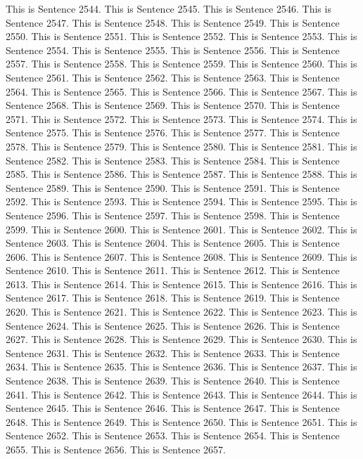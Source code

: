 \documentclass{article}
\begin{document}
This is Sentence 2544.
This is Sentence 2545.
This is Sentence 2546.
This is Sentence 2547.
This is Sentence 2548.
This is Sentence 2549.
This is Sentence 2550.
This is Sentence 2551.
This is Sentence 2552.
This is Sentence 2553.
This is Sentence 2554.
This is Sentence 2555.
This is Sentence 2556.
This is Sentence 2557.
This is Sentence 2558.
This is Sentence 2559.
This is Sentence 2560.
This is Sentence 2561.
This is Sentence 2562.
This is Sentence 2563.
This is Sentence 2564.
This is Sentence 2565.
This is Sentence 2566.
This is Sentence 2567.
This is Sentence 2568.
This is Sentence 2569.
This is Sentence 2570.
This is Sentence 2571.
This is Sentence 2572.
This is Sentence 2573.
This is Sentence 2574.
This is Sentence 2575.
This is Sentence 2576.
This is Sentence 2577.
This is Sentence 2578.
This is Sentence 2579.
This is Sentence 2580.
This is Sentence 2581.
This is Sentence 2582.
This is Sentence 2583.
This is Sentence 2584.
This is Sentence 2585.
This is Sentence 2586.
This is Sentence 2587.
This is Sentence 2588.
This is Sentence 2589.
This is Sentence 2590.
This is Sentence 2591.
This is Sentence 2592.
This is Sentence 2593.
This is Sentence 2594.
This is Sentence 2595.
This is Sentence 2596.
This is Sentence 2597.
This is Sentence 2598.
This is Sentence 2599.
This is Sentence 2600.
This is Sentence 2601.
This is Sentence 2602.
This is Sentence 2603.
This is Sentence 2604.
This is Sentence 2605.
This is Sentence 2606.
This is Sentence 2607.
This is Sentence 2608.
This is Sentence 2609.
This is Sentence 2610.
This is Sentence 2611.
This is Sentence 2612.
This is Sentence 2613.
This is Sentence 2614.
This is Sentence 2615.
This is Sentence 2616.
This is Sentence 2617.
This is Sentence 2618.
This is Sentence 2619.
This is Sentence 2620.
This is Sentence 2621.
This is Sentence 2622.
This is Sentence 2623.
This is Sentence 2624.
This is Sentence 2625.
This is Sentence 2626.
This is Sentence 2627.
This is Sentence 2628.
This is Sentence 2629.
This is Sentence 2630.
This is Sentence 2631.
This is Sentence 2632.
This is Sentence 2633.
This is Sentence 2634.
This is Sentence 2635.
This is Sentence 2636.
This is Sentence 2637.
This is Sentence 2638.
This is Sentence 2639.
This is Sentence 2640.
This is Sentence 2641.
This is Sentence 2642.
This is Sentence 2643.
This is Sentence 2644.
This is Sentence 2645.
This is Sentence 2646.
This is Sentence 2647.
This is Sentence 2648.
This is Sentence 2649.
This is Sentence 2650.
This is Sentence 2651.
This is Sentence 2652.
This is Sentence 2653.
This is Sentence 2654.
This is Sentence 2655.
This is Sentence 2656.
This is Sentence 2657.
\end{document}
